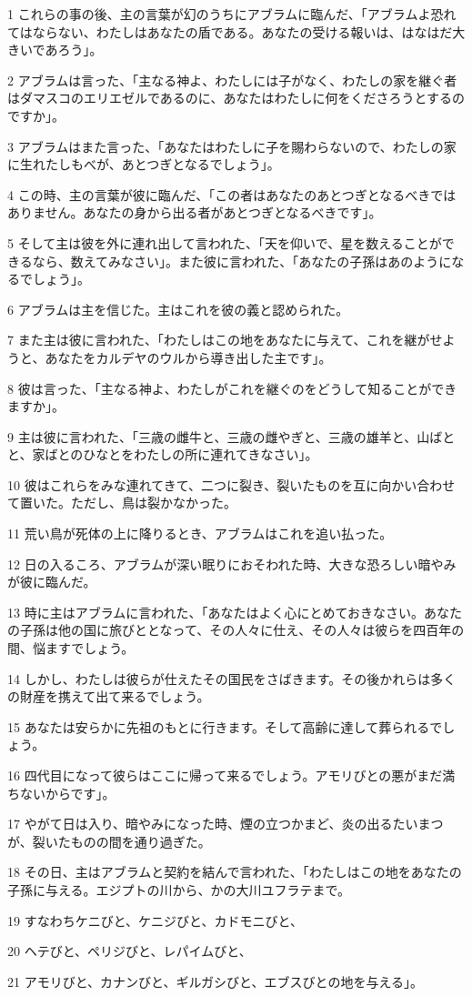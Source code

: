 \par 1 これらの事の後、主の言葉が幻のうちにアブラムに臨んだ、「アブラムよ恐れてはならない、わたしはあなたの盾である。あなたの受ける報いは、はなはだ大きいであろう」。
\par 2 アブラムは言った、「主なる神よ、わたしには子がなく、わたしの家を継ぐ者はダマスコのエリエゼルであるのに、あなたはわたしに何をくださろうとするのですか」。
\par 3 アブラムはまた言った、「あなたはわたしに子を賜わらないので、わたしの家に生れたしもべが、あとつぎとなるでしょう」。
\par 4 この時、主の言葉が彼に臨んだ、「この者はあなたのあとつぎとなるべきではありません。あなたの身から出る者があとつぎとなるべきです」。
\par 5 そして主は彼を外に連れ出して言われた、「天を仰いで、星を数えることができるなら、数えてみなさい」。また彼に言われた、「あなたの子孫はあのようになるでしょう」。
\par 6 アブラムは主を信じた。主はこれを彼の義と認められた。
\par 7 また主は彼に言われた、「わたしはこの地をあなたに与えて、これを継がせようと、あなたをカルデヤのウルから導き出した主です」。
\par 8 彼は言った、「主なる神よ、わたしがこれを継ぐのをどうして知ることができますか」。
\par 9 主は彼に言われた、「三歳の雌牛と、三歳の雌やぎと、三歳の雄羊と、山ばとと、家ばとのひなとをわたしの所に連れてきなさい」。
\par 10 彼はこれらをみな連れてきて、二つに裂き、裂いたものを互に向かい合わせて置いた。ただし、鳥は裂かなかった。
\par 11 荒い鳥が死体の上に降りるとき、アブラムはこれを追い払った。
\par 12 日の入るころ、アブラムが深い眠りにおそわれた時、大きな恐ろしい暗やみが彼に臨んだ。
\par 13 時に主はアブラムに言われた、「あなたはよく心にとめておきなさい。あなたの子孫は他の国に旅びととなって、その人々に仕え、その人々は彼らを四百年の間、悩ますでしょう。
\par 14 しかし、わたしは彼らが仕えたその国民をさばきます。その後かれらは多くの財産を携えて出て来るでしょう。
\par 15 あなたは安らかに先祖のもとに行きます。そして高齢に達して葬られるでしょう。
\par 16 四代目になって彼らはここに帰って来るでしょう。アモリびとの悪がまだ満ちないからです」。
\par 17 やがて日は入り、暗やみになった時、煙の立つかまど、炎の出るたいまつが、裂いたものの間を通り過ぎた。
\par 18 その日、主はアブラムと契約を結んで言われた、「わたしはこの地をあなたの子孫に与える。エジプトの川から、かの大川ユフラテまで。
\par 19 すなわちケニびと、ケニジびと、カドモニびと、
\par 20 ヘテびと、ペリジびと、レパイムびと、
\par 21 アモリびと、カナンびと、ギルガシびと、エブスびとの地を与える」。


